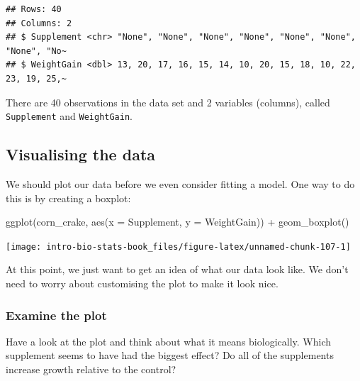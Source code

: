 \documentclass[
]{book}
\newenvironment{Shaded}{\begin{snugshade}}{\end{snugshade}}
\newcommand{\AttributeTok}[1]{\textcolor[rgb]{0.77,0.63,0.00}{#1}}
\newcommand{\FunctionTok}[1]{\textcolor[rgb]{0.00,0.00,0.00}{#1}}
\newcommand{\NormalTok}[1]{#1}
\newcommand{\SpecialCharTok}[1]{\textcolor[rgb]{0.00,0.00,0.00}{#1}}
\newenvironment{greybox}{
  \definecolor{shadecolor}{rgb}{0.95,0.95,0.95}  %
  \color{black}
  \begin{shaded}}
 {\end{shaded}}
\newenvironment{infobox}[1]
  {
  \begin{itemize}
  \renewcommand{\labelitemi}{
    \raisebox{-.7\height}[0pt][0pt]{
      {\setkeys{Gin}{width=3em,keepaspectratio}
        \texttt{[image: images/\#1]}}
    }
  }
  \setlength{\fboxsep}{1em}
  \begin{greybox}
  \item
  }
  {
  \end{greybox}
  \end{itemize}
  }
\begin{document}
\begin{verbatim}
## Rows: 40
## Columns: 2
## $ Supplement <chr> "None", "None", "None", "None", "None", "None", "None", "No~
## $ WeightGain <dbl> 13, 20, 17, 16, 15, 14, 10, 20, 15, 18, 10, 22, 23, 19, 25,~
\end{verbatim}

There are 40 observations in the data set and 2 variables (columns), called \texttt{Supplement} and \texttt{WeightGain}.

\hypertarget{visualising-the-data-1}{%
\subsection{Visualising the data}\label{visualising-the-data-1}}

We should plot our data before we even consider fitting a model. One way to do this is by creating a boxplot:

\begin{Shaded}
\begin{Highlighting}[]
\FunctionTok{ggplot}\NormalTok{(corn\_crake, }\FunctionTok{aes}\NormalTok{(}\AttributeTok{x =}\NormalTok{ Supplement, }\AttributeTok{y =}\NormalTok{ WeightGain)) }\SpecialCharTok{+} 
  \FunctionTok{geom\_boxplot}\NormalTok{()}
\end{Highlighting}
\end{Shaded}

\begin{center}\texttt{[image: intro-bio-stats-book\_files/figure-latex/unnamed-chunk-107-1]} \end{center}

At this point, we just want to get an idea of what our data look like. We don't need to worry about customising the plot to make it look nice.

\begin{infobox}{action}

\hypertarget{examine-the-plot}{%
\subsubsection*{Examine the plot}\label{examine-the-plot}}

Have a look at the plot and think about what it means biologically. Which supplement seems to have had the biggest effect? Do all of the supplements increase growth relative to the control?

\end{infobox}
\end{document}
